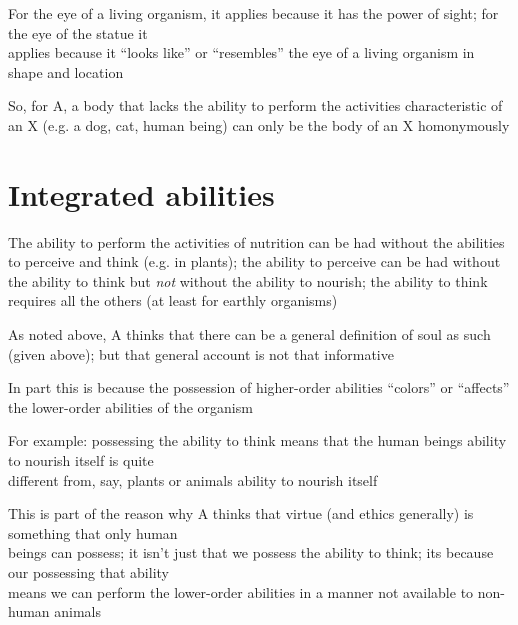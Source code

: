 \documentclass[11pt]{article}
\begin{document}
For the eye of a living organism, it applies because it has the power of sight; for the eye of the statue it\\\hspace*{6mm}applies because it ``looks like'' or ``resembles'' the eye of a living organism in shape and location
\vspace*{2mm}

\noindent So, for A, a body that lacks the ability to perform the activities characteristic of an X (e.g. a dog, cat, human being) can only be the body of an X homonymously

\section*{Integrated abilities}

\noindent The ability to perform the activities of nutrition can be had without the abilities to perceive and think (e.g. in plants); the ability to perceive can be had without the ability to think but \emph{not} without the ability to nourish; the ability to think requires all the others (at least for earthly organisms)
\vspace*{2mm}

\noindent As noted above, A thinks that there can be a general definition of soul as such (given above); but that general account is not that informative
\vspace*{2mm}

\noindent In part this is because the possession of higher-order abilities ``colors'' or ``affects'' the lower-order abilities of the organism
\vspace*{1mm}

For example: possessing the ability to think means that the human beings ability to nourish itself is quite\\\hspace*{6mm}different from, say, plants or animals ability to nourish itself
\vspace*{1mm}

This is part of the reason why A thinks that virtue (and ethics generally) is something that only human\\\hspace*{6mm}beings can possess; it isn't just that we possess the ability to think; its because our possessing that ability\\\hspace*{6mm}means we can perform the lower-order abilities in a manner not available to non-human animals
\end{document}
